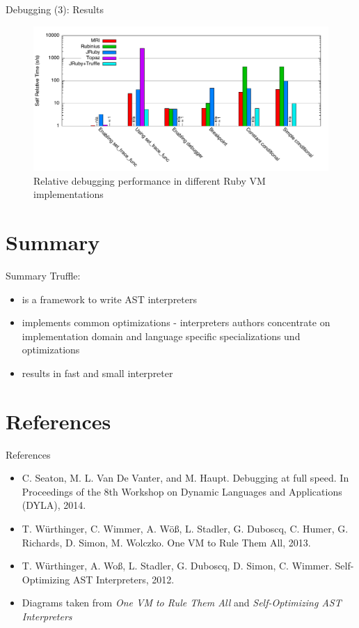 \documentclass[xcolor=dvipsname,handout]{beamer} %
\begin{document}
\begin{frame}{Debugging (3): Results}
\begin{figure}
  \includegraphics[width=\textwidth]{performance-debugging.pdf}
  \caption{Relative debugging performance in different Ruby VM implementations}
  \label{fig:debuggin_performance}
\end{figure}
\end{frame}


\section{Summary}

\begin{frame}{Summary}
Truffle:
\begin{itemize}
\item is a framework to write AST interpreters
\item implements common optimizations - interpreters authors concentrate on implementation domain and language specific specializations und optimizations
\item results in fast and small interpreter
\end{itemize}
\end{frame}


\section{References}

\begin{frame}{References}
\begin{itemize}
  \item C. Seaton, M. L. Van De Vanter, and M. Haupt. Debugging at full speed. In Proceedings of the 8th Workshop on Dynamic Languages and Applications (DYLA), 2014.
  \item T. Würthinger, C. Wimmer, A. Wöß, L. Stadler, G. Duboscq, C. Humer, G. Richards, D. Simon, M. Wolczko. One VM to Rule Them All, 2013.
  \item T. Würthinger, A. Woß, L. Stadler, G. Duboscq, D. Simon, C. Wimmer. Self-Optimizing AST Interpreters, 2012.

  \item Diagrams taken from \emph{One VM to Rule Them All} and \emph{Self-Optimizing AST Interpreters}
\end{itemize}
\end{frame}
\end{document}
